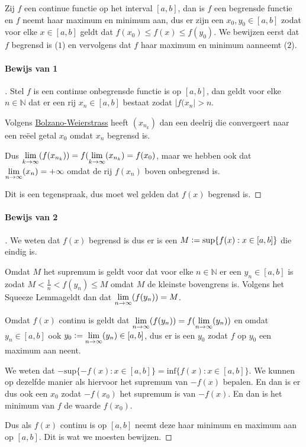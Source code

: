 
Zij $f$ een continue functie op het interval $[a,b]$, dan is $f$ een begrensde functie en $f$ neemt haar maximum en minimum aan, dus er zijn een $x_{0},y_{0}\in [a,b]$ zodat voor elke $x\in [a,b]$ geldt dat $f(x_{0}) \leq f(x) \leq f(y_{0})$. We bewijzen eerst dat $f$ begrensd is ($1$) en vervolgens dat $f$ haar maximum en minimum aanneemt ($2$).

\paragraph{Bewijs van 1}

\begin{proof}[\unskip\nopunct]

Stel $f$ is een continue onbegrensde functie is op $[a,b]$, dan geldt voor elke $n\in\mathbb{N}$ dat er een rij $x_{n}\in[a,b]$ bestaat zodat $|f(x_{n}|>n$. \bigskip

\noindent Volgens \hyperref[sec:AC]{Bolzano-Weierstrass} heeft $(x_{n_{k}})$ dan een deelrij die convergeert naar een reëel getal $x_{0}$ omdat $x_{n}$ begrensd is. \bigskip

\noindent Dus $\underset{k\to\infty}{\text{lim}}(f(x_{n_{k}}))=f(\underset{k\to\infty}{\text{lim}}(x_{n_{k}})=f(x_{0})$, maar we hebben ook dat $\underset{n\to\infty}{\text{lim}}(x_{n})=+\infty$ omdat de rij $f(x_{n})$ boven onbegrensd is. \bigskip

\noindent Dit is een tegenspraak, dus moet wel gelden dat $f(x)$ begrensd is.

\end{proof}

\paragraph{Bewijs van 2}

\begin{proof}[\unskip\nopunct]

We weten dat $f(x)$ begrensd is dus er is een $M\vcentcolon=\text{sup}\{f(x):x\in[a,b]\}$ die eindig is. \bigskip

\noindent Omdat $M$ het supremum is geldt voor dat voor elke $n\in\mathbb{N}$ er een $y_{n}\in[a,b]$ is zodat $M < \frac{1}{n}<f(y_{n}) \leq M$ omdat $M$ de kleinste bovengrens is. Volgens het \bq Squeeze Lemma\eq geldt dan dat $\underset{n\to\infty}{\text{lim}}(f(y_{n}))=M$. \bigskip

\noindent Omdat $f(x)$ continu is geldt dat $\underset{n\to\infty}{\text{lim}}(f(y_{n}))=f(\underset{n\to\infty}{\text{lim}}(y_{n}))$ en omdat $y_{n}\in[a,b]$ ook $y_{0}\vcentcolon=\underset{n\to\infty}{\text{lim}}(y_{n})\in[a,b]$, dus er is een $y_{0}$ zodat $f$ op $y_{0}$ een maximum aan neent. \bigskip

\noindent We weten dat $-\text{sup}\{-f(x):x\in[a,b]\}=\text{inf}\{f(x):x\in[a,b]\}$. We kunnen op dezelfde manier als hiervoor het supremum van $-f(x)$ bepalen. En dan is er dus ook een $x_{0}$ zodat $-f(x_{0})$ het supremum is van $-f(x)$. En dan is het minimum van $f$ de waarde $f(x_{0})$. \bigskip

\noindent Dus als $f(x)$ continu is op $[a,b]$ neemt deze haar minimum en maximum aan op $[a,b]$. Dit is wat we moesten bewijzen.

\end{proof}